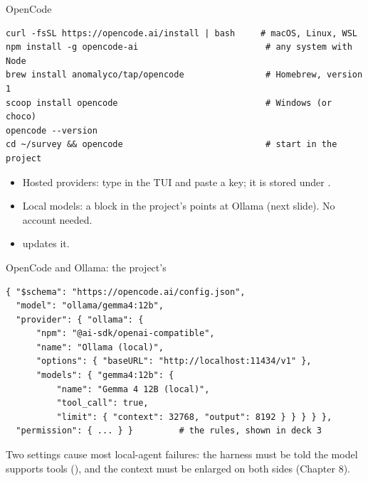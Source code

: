 \documentclass[11pt,aspectratio=169]{beamer}
\begin{document}
\begin{frame}[fragile]{OpenCode}
  \begin{lstlisting}[style=shell]
curl -fsSL https://opencode.ai/install | bash     # macOS, Linux, WSL
npm install -g opencode-ai                         # any system with Node
brew install anomalyco/tap/opencode                # Homebrew, version 1
scoop install opencode                             # Windows (or choco)
opencode --version
cd ~/survey && opencode                            # start in the project
  \end{lstlisting}
  \begin{itemize}
    \item Hosted providers: type  in the TUI and paste a key;
      it is stored under .
    \item Local models: a  block in the project's
       points at Ollama (next slide). No account needed.
    \item {} updates it.
  \end{itemize}
\end{frame}

\begin{frame}[fragile]{OpenCode and Ollama: the project's }
  \begin{lstlisting}
{ "$schema": "https://opencode.ai/config.json",
  "model": "ollama/gemma4:12b",
  "provider": { "ollama": {
      "npm": "@ai-sdk/openai-compatible",
      "name": "Ollama (local)",
      "options": { "baseURL": "http://localhost:11434/v1" },
      "models": { "gemma4:12b": {
          "name": "Gemma 4 12B (local)",
          "tool_call": true,
          "limit": { "context": 32768, "output": 8192 } } } } },
  "permission": { ... } }         # the rules, shown in deck 3
  \end{lstlisting}
  Two settings cause most local-agent failures: the harness must be told the
  model supports tools (), and the context must be enlarged
  on both sides (Chapter 8).
\end{frame}
\end{document}
